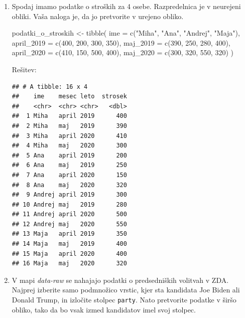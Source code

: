 \documentclass[
]{book}
\newenvironment{Shaded}{\begin{snugshade}}{\end{snugshade}}
\newcommand{\AttributeTok}[1]{\textcolor[rgb]{0.77,0.63,0.00}{#1}}
\newcommand{\DecValTok}[1]{\textcolor[rgb]{0.00,0.00,0.81}{#1}}
\newcommand{\FunctionTok}[1]{\textcolor[rgb]{0.00,0.00,0.00}{#1}}
\newcommand{\NormalTok}[1]{#1}
\newcommand{\OtherTok}[1]{\textcolor[rgb]{0.56,0.35,0.01}{#1}}
\newcommand{\StringTok}[1]{\textcolor[rgb]{0.31,0.60,0.02}{#1}}
\begin{document}
\begin{enumerate}
\def\labelenumi{\arabic{enumi})}
\item
  Spodaj imamo podatke o stroških za 4 osebe. Razpredelnica je v neurejeni obliki. Vaša naloga je, da jo pretvorite v urejeno obliko.

\begin{Shaded}
\begin{Highlighting}[]
\NormalTok{podatki\_o\_stroskih }\OtherTok{\textless{}{-}} \FunctionTok{tibble}\NormalTok{(}
  \AttributeTok{ime =} \FunctionTok{c}\NormalTok{(}\StringTok{"Miha"}\NormalTok{, }\StringTok{"Ana"}\NormalTok{, }\StringTok{"Andrej"}\NormalTok{, }\StringTok{"Maja"}\NormalTok{),}
  \AttributeTok{april\_2019 =} \FunctionTok{c}\NormalTok{(}\DecValTok{400}\NormalTok{, }\DecValTok{200}\NormalTok{, }\DecValTok{300}\NormalTok{, }\DecValTok{350}\NormalTok{),}
  \AttributeTok{maj\_2019 =} \FunctionTok{c}\NormalTok{(}\DecValTok{390}\NormalTok{, }\DecValTok{250}\NormalTok{, }\DecValTok{280}\NormalTok{, }\DecValTok{400}\NormalTok{),}
  \AttributeTok{april\_2020 =} \FunctionTok{c}\NormalTok{(}\DecValTok{410}\NormalTok{, }\DecValTok{150}\NormalTok{, }\DecValTok{500}\NormalTok{, }\DecValTok{400}\NormalTok{),}
  \AttributeTok{maj\_2020 =} \FunctionTok{c}\NormalTok{(}\DecValTok{300}\NormalTok{, }\DecValTok{320}\NormalTok{, }\DecValTok{550}\NormalTok{, }\DecValTok{320}\NormalTok{)}
\NormalTok{)}
\end{Highlighting}
\end{Shaded}

  Rešitev:

\begin{verbatim}
## # A tibble: 16 x 4
##    ime    mesec leto  strosek
##    <chr>  <chr> <chr>   <dbl>
##  1 Miha   april 2019      400
##  2 Miha   maj   2019      390
##  3 Miha   april 2020      410
##  4 Miha   maj   2020      300
##  5 Ana    april 2019      200
##  6 Ana    maj   2019      250
##  7 Ana    april 2020      150
##  8 Ana    maj   2020      320
##  9 Andrej april 2019      300
## 10 Andrej maj   2019      280
## 11 Andrej april 2020      500
## 12 Andrej maj   2020      550
## 13 Maja   april 2019      350
## 14 Maja   maj   2019      400
## 15 Maja   april 2020      400
## 16 Maja   maj   2020      320
\end{verbatim}
\item
  V mapi \emph{data-raw} se nahajajo podatki o predsedniških volitvah v ZDA. Najprej izberite samo podmnožico vrstic, kjer sta kandidata Joe Biden ali Donald Trump, in izločite stolpec \texttt{party}. Nato pretvorite podatke v širšo obliko, tako da bo vsak izmed kandidatov imel svoj stolpec.


\end{enumerate}
\end{document}
